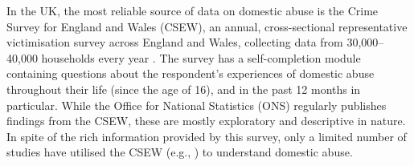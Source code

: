 \documentclass[11pt, a4paper]{article}
\begin{document}

In the UK, the most reliable source of data on domestic abuse is the Crime Survey for England and Wales (CSEW), an annual, cross-sectional representative victimisation survey across England and Wales, collecting data from 30,000--40,000 households every year \cite{OfficeforNationalStatistics2019}. The survey has a self-completion module containing questions about the respondent's experiences of domestic abuse throughout their life (since the age of 16), and in the past 12 months in particular.  While the Office for National Statistics (ONS) regularly publishes findings from the CSEW, these are mostly exploratory and descriptive in nature. In spite of the rich information provided by this survey, only a limited number of studies have utilised the CSEW (e.g., ) to understand domestic abuse. 
 
\end{document}
